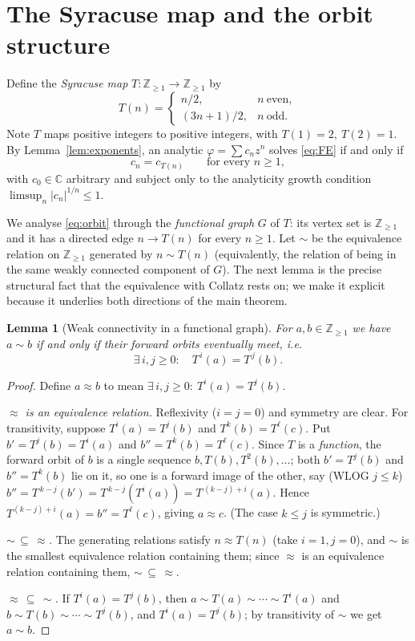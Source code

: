 \documentclass{amsart}
\newtheorem{lemma}{Lemma}
\theoremstyle{remark}
\begin{document}
\section{The Syracuse map and the orbit structure}

Define the \emph{Syracuse map} $T:\mathbb{Z}_{\ge1}\to\mathbb{Z}_{\ge1}$ by
\[
T(n)=
\begin{cases}
n/2, & n\ \text{even},\\
(3n+1)/2, & n\ \text{odd}.
\end{cases}
\]
Note $T$ maps positive integers to positive integers, with $T(1)=2,\ T(2)=1$. By
Lemma~\ref{lem:exponents}, an analytic $\varphi=\sum c_n z^n$ solves \eqref{eq:FE} if and only if
\begin{equation}\label{eq:orbit}
c_n=c_{T(n)}\qquad\text{for every } n\ge1,
\end{equation}
with $c_0\in\mathbb{C}$ arbitrary and subject only to the analyticity growth condition
$\limsup_{n}|c_n|^{1/n}\le1$.

We analyse \eqref{eq:orbit} through the \emph{functional graph} $G$ of $T$: its vertex set is
$\mathbb{Z}_{\ge1}$ and it has a directed edge $n\to T(n)$ for every $n\ge1$. Let $\sim$ be the
equivalence relation on $\mathbb{Z}_{\ge1}$ generated by $n\sim T(n)$ (equivalently, the relation
of being in the same weakly connected component of $G$). The next lemma is the precise structural
fact that the equivalence with Collatz rests on; we make it explicit because it underlies both
directions of the main theorem.

\begin{lemma}[Weak connectivity in a functional graph]\label{lem:wc}
For $a,b\in\mathbb{Z}_{\ge1}$ we have $a\sim b$ if and only if their forward orbits eventually
meet, i.e.
\[
\exists\, i,j\ge0:\quad T^{\,i}(a)=T^{\,j}(b).
\]
\end{lemma}
\begin{proof}
Define $a\approx b$ to mean $\exists\,i,j\ge0:\ T^i(a)=T^j(b)$.

\emph{$\approx$ is an equivalence relation.} Reflexivity ($i=j=0$) and symmetry are clear. For
transitivity, suppose $T^i(a)=T^j(b)$ and $T^k(b)=T^\ell(c)$. Put $b'=T^j(b)=T^i(a)$ and
$b''=T^k(b)=T^\ell(c)$. Since $T$ is a \emph{function}, the forward orbit of $b$ is a single
sequence $b,T(b),T^2(b),\dots$; both $b'=T^j(b)$ and $b''=T^k(b)$ lie on it, so one is a forward
image of the other, say (WLOG $j\le k$) $b''=T^{\,k-j}(b')=T^{\,k-j}(T^i(a))=T^{\,(k-j)+i}(a)$.
Hence $T^{(k-j)+i}(a)=b''=T^\ell(c)$, giving $a\approx c$. (The case $k\le j$ is symmetric.)

\emph{$\sim\,\subseteq\,\approx$.} The generating relations satisfy $n\approx T(n)$ (take
$i=1,j=0$), and $\sim$ is the smallest equivalence relation containing them; since $\approx$ is an
equivalence relation containing them, $\sim\,\subseteq\,\approx$.

\emph{$\approx\,\subseteq\,\sim$.} If $T^i(a)=T^j(b)$, then $a\sim T(a)\sim\cdots\sim T^i(a)$ and
$b\sim T(b)\sim\cdots\sim T^j(b)$, and $T^i(a)=T^j(b)$; by transitivity of $\sim$ we get
$a\sim b$.
\end{proof}
\end{document}
